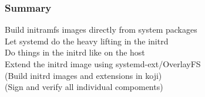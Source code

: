 \documentclass[]{beamer}
\newcommand{\done}{\textcolor{teal}{\checkmark}}
\newcommand{\pull}[3]{\href{https://github.com/systemd/#1/pulls/#2}{#3 (\##2)}}
\newcommand{\pulldone}[3]{\pull{#1}{#2}{#3} \done}
\newcommand{\commit}[3]{\href{https://github.com/systemd/#1/commit/#2}{#3 (#2)}}
\newcommand{\commitdone}[3]{\commit{#1}{#2}{#3} \done}
\begin{document}












 
\begin{frame}
  \frametitle{Summary}

  Build initramfs images directly from system packages\\
  Let systemd do the heavy lifting in the initrd\\
  Do things in the initrd like on the host\\
  Extend the initrd image using systemd-ext/OverlayFS\\
  (Build initrd images and extensions in koji)\\
  (Sign and verify all individual compoments)
\end{frame}
\end{document}
